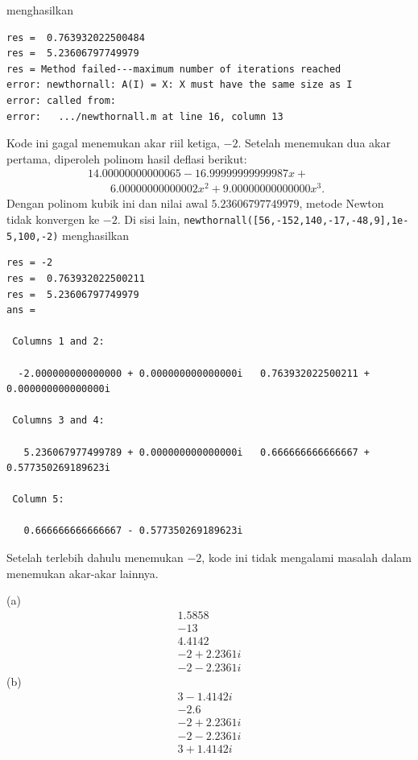 \begin{description}
\begin{description}
menghasilkan \begin{verbatim}
res =  0.763932022500484
res =  5.23606797749979
res = Method failed---maximum number of iterations reached
error: newthornall: A(I) = X: X must have the same size as I
error: called from:
error:   .../newthornall.m at line 16, column 13
\end{verbatim}

Kode ini gagal menemukan akar riil ketiga, $-2$. Setelah menemukan
dua akar pertama, diperoleh polinom hasil deflasi berikut:
\[
\begin{gathered}14.00000000000065-16.99999999999987x+\qquad\\
\qquad6.00000000000002x^{2}+9.00000000000000x^{3}.
\end{gathered}
\]
Dengan polinom kubik ini dan nilai awal $5.23606797749979$, metode
Newton tidak konvergen ke $-2$. Di sisi lain, \texttt{newthornall({[}56,-152,140,-17,-48,9{]},1e-5,100,-2)}
menghasilkan \begin{verbatim}
res = -2
res =  0.763932022500211
res =  5.23606797749979
ans =

 Columns 1 and 2:

  -2.000000000000000 + 0.000000000000000i   0.763932022500211 + 0.000000000000000i

 Columns 3 and 4:

   5.236067977499789 + 0.000000000000000i   0.666666666666667 + 0.577350269189623i

 Column 5:

   0.666666666666667 - 0.577350269189623i
\end{verbatim}

Setelah terlebih dahulu menemukan $-2$, kode ini tidak mengalami
masalah dalam menemukan akar-akar lainnya.
\end{description}
\item [{\ref{exc:polynomials-15}:}] (a) 
\[
\begin{gathered}1.5858\\
-13\\
4.4142\\
-2+2.2361i\\
-2-2.2361i
\end{gathered}
\]
(b) 
\[
\begin{gathered}3-1.4142i\\
-2.6\\
-2+2.2361i\\
-2-2.2361i\\
3+1.4142i
\end{gathered}
\]
\end{description}

